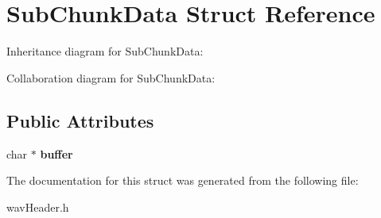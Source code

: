 \hypertarget{structSubChunkData}{}\section{Sub\+Chunk\+Data Struct Reference}
\label{structSubChunkData}


Inheritance diagram for Sub\+Chunk\+Data\+:


Collaboration diagram for Sub\+Chunk\+Data\+:
\subsection*{Public Attributes}
\begin{DoxyCompactItemize}
\item 
\mbox{\label{structSubChunkData_a8f026b9f6a0e1f74318438e61656955e}} 
char $\ast$ {\bfseries buffer}
\end{DoxyCompactItemize}


The documentation for this struct was generated from the following file\+:\begin{DoxyCompactItemize}
\item 
wav\+Header.\+h\end{DoxyCompactItemize}
